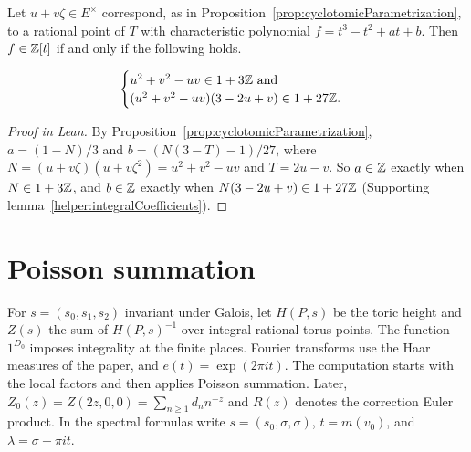 \begin{equationnode}

\label{eqn:integralityConditionsUsingCyclo}


\leanok

Let $u+v\zeta\in E^\times$ correspond, as in Proposition~\ref{prop:cyclotomicParametrization}, to a rational point of $T$ with characteristic polynomial $f=t^3-t^2+at+b$. Then $f\in\mathbb{Z}[t]$ if and only if the following holds.

\begin{equation*} \begin{cases} u^2+v^2-uv \in 1+3 \mathbb{Z} \text{ and }\\ (u^2+v^2-uv)(3-2u+v) \in 1+27 \mathbb{Z}. \end{cases} \end{equation*}

\end{equationnode}

\begin{proof}[Proof in Lean]

\leanok


By Proposition~\ref{prop:cyclotomicParametrization}, $a=(1-N)/3$ and $b=(N(3-T)-1)/27$, where $N=(u+v\zeta)(u+v\zeta^2)=u^2+v^2-uv$ and $T=2u-v$. So $a\in\mathbb{Z}$ exactly when $N\in1+3\mathbb{Z}$, and $b\in\mathbb{Z}$ exactly when $N(3-2u+v)\in1+27\mathbb{Z}$ (Supporting lemma~\ref{helper:integralCoefficients}).

\end{proof}

\chapter{Poisson summation}

For $s=(s_0,s_1,s_2)$ invariant under Galois, let $H(P,s)$ be the toric height and $Z(s)$ the sum of $H(P,s)^{-1}$ over integral rational torus points. The function $1^{D_0}$ imposes integrality at the finite places. Fourier transforms use the Haar measures of the paper, and $e(t)=\exp(2\pi it)$. The computation starts with the local factors and then applies Poisson summation. Later, $Z_0(z)=Z(2z,0,0)=\sum_{n\geq1}d_n n^{-z}$ and $R(z)$ denotes the correction Euler product. In the spectral formulas write $s=(s_0,\sigma,\sigma)$, $t=m(v_0)$, and $\lambda=\sigma-\pi it$.

